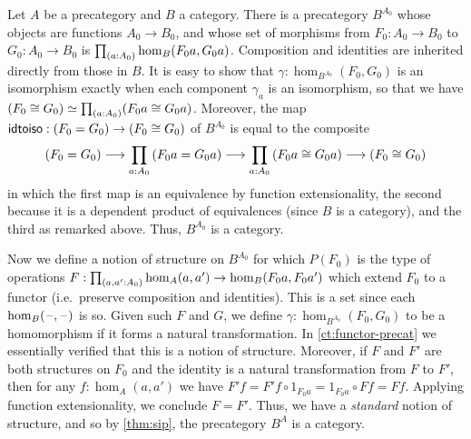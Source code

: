 \documentclass[hott-all.tex]{subfiles}
\begin{document}

\begin{eg}\label{ct:sip-functor-cat}
  Let $A$ be a precategory and $B$ a category.
  There is a precategory $B^{A_0}$ whose objects are functions $A_0 \to B_0$, and whose set of morphisms from $F_0:A_0 \to B_0$ to $G_0:A_0 \to B_0$ is $\prd{a:A_0} \hom_B(F_0 a, G_0 a)$.
  Composition and identities are inherited directly from those in $B$.
  It is easy to show that $\gamma:\hom_{B^{A_0}}(F_0, G_0)$ is an isomorphism exactly when each component $\gamma_a$ is an isomorphism, so that we have $\eqv{(F_0 \cong G_0)}{\prd{a:A_0} (F_0 a \cong G_0 a)}$.
  Moreover, the map $\mathsf{idtoiso} : (F_0 = G_0) \to (F_0 \cong G_0)$ of $B^{A_0}$ is equal to the composite
  \[ (F_0 = G_0) \longrightarrow \prd{a:A_0} (F_0 a  = G_0 a) \longrightarrow \prd{a:A_0} (F_0 a \cong G_0 a) \longrightarrow (F_0 \cong G_0) \]
  in which the first map is an equivalence by function extensionality, the second because it is a dependent product of equivalences (since $B$ is a category), and the third as remarked above.
  Thus, $B^{A_0}$ is a category.

  Now we define a notion of structure on $B^{A_0}$ for which $P(F_0)$ is the type of operations $F:\prd{a,a':A_0} \hom_A(a,a') \to \hom_B(F_0 a,F_0 a')$ which extend $F_0$ to a functor (i.e.\ preserve composition and identities).
  This is a set since each $\hom_B(\mathord{\hspace{1pt}\text{--}\hspace{1pt}},\mathord{\hspace{1pt}\text{--}\hspace{1pt}})$ is so.
  Given such $F$ and $G$, we define $\gamma:\hom_{B^{A_0}}(F_0, G_0)$ to be a homomorphism if it forms a natural transformation.
  In \cref{ct:functor-precat} we essentially verified that this is a notion of structure.
  Moreover, if $F$ and $F'$ are both structures on $F_0$ and the identity is a natural transformation from $F$ to $F'$, then for any $f:\hom_A(a,a')$ we have $F'f = F'f \circ 1_{F_0 a} = 1_{F_0 a}\circ F f = F f$.
  Applying function extensionality, we conclude $F = F'$.
  Thus, we have a \emph{standard} notion of structure, and so by \cref{thm:sip}, the precategory $B^A$ is a category.
\end{eg}
\end{document}
